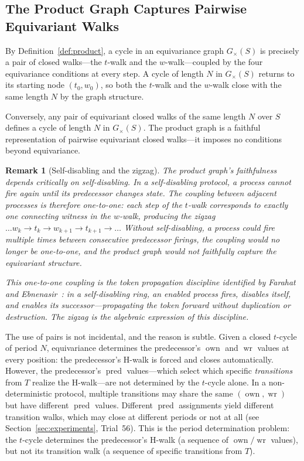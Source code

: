 \documentclass[11pt]{article}
\newtheorem{remark}{Remark}
\begin{document}
\subsection{The Product Graph Captures Pairwise Equivariant Walks}

By Definition~\ref{def:product}, a cycle in an equivariance graph $G_\times(S)$ is precisely a pair of closed walks---the $t$-walk and the $w$-walk---coupled by the four equivariance conditions at every step. A cycle of length $N$ in $G_\times(S)$ returns to its starting node $(t_0, w_0)$, so both the $t$-walk and the $w$-walk close with the same length $N$ by the graph structure.

Conversely, any pair of equivariant closed walks of the same length $N$ over $S$ defines a cycle of length $N$ in $G_\times(S)$. The product graph is a faithful representation of pairwise equivariant closed walks---it imposes no conditions beyond equivariance.

\begin{remark}[Self-disabling and the zigzag]
The product graph's faithfulness depends critically on self-disabling. In a self-disabling protocol, a process cannot fire again until its predecessor changes state. The coupling between adjacent processes is therefore one-to-one: each step of the $t$-walk corresponds to exactly one connecting witness in the $w$-walk, producing the zigzag $\ldots w_k \to t_k \to w_{k+1} \to t_{k+1} \to \ldots$ Without self-disabling, a process could fire multiple times between consecutive predecessor firings, the coupling would no longer be one-to-one, and the product graph would not faithfully capture the equivariant structure.

This one-to-one coupling is the token propagation discipline identified by Farahat and Ebnenasir~\cite{farahat-icdcs2012}: in a self-disabling ring, an enabled process fires, disables itself, and enables its successor---propagating the token forward without duplication or destruction. The zigzag is the algebraic expression of this discipline.
\end{remark}

The use of pairs is not incidental, and the reason is subtle. Given a closed $t$-cycle of period $N$, equivariance determines the predecessor's $\operatorname{own}$ and $\operatorname{wr}$ values at every position: the predecessor's H-walk is forced and closes automatically. However, the predecessor's $\operatorname{pred}$ values---which select which specific \emph{transitions} from $T$ realize the H-walk---are not determined by the $t$-cycle alone. In a non-deterministic protocol, multiple transitions may share the same $(\operatorname{own}, \operatorname{wr})$ but have different $\operatorname{pred}$ values. Different $\operatorname{pred}$ assignments yield different transition walks, which may close at different periods or not at all (see Section~\ref{sec:experiments}, Trial~56). This is the period determination problem: the $t$-cycle determines the predecessor's H-walk (a sequence of $\operatorname{own}/\operatorname{wr}$ values), but not its transition walk (a sequence of specific transitions from $T$).
\end{document}
